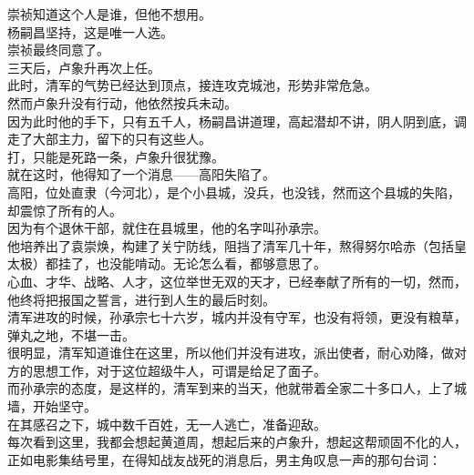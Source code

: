 \begin{multicols}{\theparacolNo}
崇祯知道这个人是谁，但他不想用。\\

杨嗣昌坚持，这是唯一人选。\\

崇祯最终同意了。\\

三天后，卢象升再次上任。\\

此时，清军的气势已经达到顶点，接连攻克城池，形势非常危急。\\

然而卢象升没有行动，他依然按兵未动。\\

因为此时他的手下，只有五千人，杨嗣昌讲道理，高起潜却不讲，阴人阴到底，调走了大部主力，留下的只有这些人。\\

打，只能是死路一条，卢象升很犹豫。\\

就在这时，他得知了一个消息——高阳失陷了。\\

高阳，位处直隶（今河北），是个小县城，没兵，也没钱，然而这个县城的失陷，却震惊了所有的人。\\

因为有个退休干部，就住在县城里，他的名字叫孙承宗。\\

他培养出了袁崇焕，构建了关宁防线，阻挡了清军几十年，熬得努尔哈赤（包括皇太极）都挂了，也没能啃动。无论怎么看，都够意思了。\\

心血、才华、战略、人才，这位举世无双的天才，已经奉献了所有的一切，然而，他终将把报国之誓言，进行到人生的最后时刻。\\

清军进攻的时候，孙承宗七十六岁，城内并没有守军，也没有将领，更没有粮草，弹丸之地，不堪一击。\\

很明显，清军知道谁住在这里，所以他们并没有进攻，派出使者，耐心劝降，做对方的思想工作，对于这位超级牛人，可谓是给足了面子。\\

而孙承宗的态度，是这样的，清军到来的当天，他就带着全家二十多口人，上了城墙，开始坚守。\\

在其感召之下，城中数千百姓，无一人逃亡，准备迎敌。\\

每次看到这里，我都会想起黄道周，想起后来的卢象升，想起这帮顽固不化的人，正如电影集结号里，在得知战友战死的消息后，男主角叹息一声的那句台词：\\


\end{multicols}
